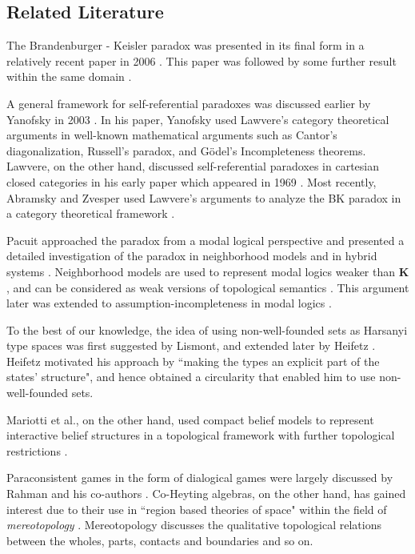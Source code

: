\documentclass{article}
\begin{document}
\subsection{Related Literature} 

The Brandenburger - Keisler paradox was presented in its final form in a relatively recent paper in 2006 \cite{bran0}. This paper was followed by some further result within the same domain \cite{bran1}. 

A general framework for self-referential paradoxes was discussed earlier by Yanofsky in 2003 \cite{yan}. In his paper, Yanofsky used Lawvere's category theoretical arguments in well-known mathematical arguments such as Cantor's diagonalization, Russell's paradox, and G\"{o}del's Incompleteness theorems. Lawvere, on the other hand, discussed self-referential paradoxes in cartesian closed categories in his early paper which appeared in 1969 \cite{law0}. Most recently, Abramsky and Zvesper used Lawvere's arguments to analyze the BK paradox in a category theoretical framework \cite{abr0}.

Pacuit approached the paradox from a modal logical perspective and presented a detailed investigation of the paradox in neighborhood models and in hybrid systems \cite{pac2}. Neighborhood models are used to represent modal logics weaker than $\mathbf{K}$, and can be considered as weak versions of topological semantics \cite{che}. This argument later was extended to assumption-incompleteness in modal logics \cite{pac4}.

To the best of our knowledge, the idea of using non-well-founded sets as Harsanyi type spaces was first suggested by Lismont, and extended later by Heifetz \cite{lis,heif}. Heifetz motivated his approach by ``making the types an explicit part of the states' structure", and hence obtained a circularity that enabled him to use non-well-founded sets.

Mariotti et al., on the other hand, used compact belief models to represent interactive belief structures in a topological framework with further topological restrictions \cite{mar}.

Paraconsistent games in the form of dialogical games were largely discussed by Rahman and his co-authors \cite{rah}. Co-Heyting algebras, on the other hand, has gained interest due to their use in ``region based theories of space" within the field of \emph{mereotopology} \cite{ste2}. Mereotopology discusses the qualitative topological relations between the wholes, parts, contacts and boundaries and so on.
\end{document}

